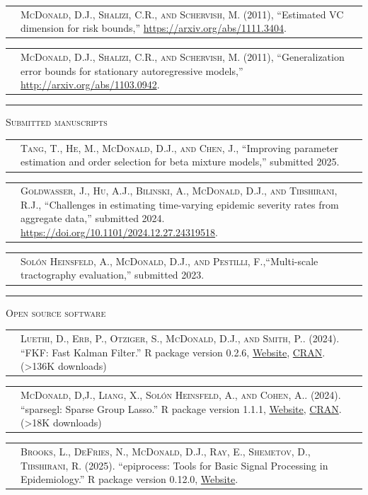 \documentclass[11pt,letterpaper]{minimal/moderncv}
\makeatletter
\renewcommand{\section}[1]{  \par\addvspace{15pt}%
  \parbox[t]{\hintscolumnwidth}{\strut\raggedleft\raisebox{4pt}%
  {\rule{\hintscolumnwidth}{2pt}}}%
  \hspace{\separatorcolumnwidth}%
  \textsc{\Large #1}\par\nobreak\addvspace{6pt}%
}
\renewcommand*{\cvitem}[2]{%
  \begin{tabular}{@{}p{\hintscolumnwidth}@{\hspace{\separatorcolumnwidth}}%
    p{\maincolumnwidth}@{}}%
    \raggedleft {#1} &  {#2}%
  \end{tabular}%
}
\makeatother
\begin{document}
\cvitem{}{{\scshape McDonald, D.J., Shalizi, C.R., and Schervish, M.} (2011),
``Estimated VC dimension for risk bounds,''
\url{https://arxiv.org/abs/1111.3404}.\vspace*{6pt}}

\cvitem{}{{\scshape McDonald, D.J., Shalizi, C.R., and Schervish, M.} (2011),
``Generalization error bounds for stationary autoregressive models,''
\url{http://arxiv.org/abs/1103.0942}.}

\section{Submitted manuscripts}

\cvitem{}{{\scshape Tang, T., He, M., McDonald, D.J., and Chen, J.}, ``Improving
parameter estimation and order selection for beta mixture models,'' submitted 2025.\vspace*{6pt}
}


\cvitem{}{{\scshape Goldwasser, J., Hu, A.J., Bilinski, A., McDonald, D.J., and
Tibshirani, R.J.}, ``Challenges in estimating time-varying epidemic severity
rates from aggregate data,'' submitted 2024. 
\url{https://doi.org/10.1101/2024.12.27.24319518}.\vspace*{6pt}
}



\cvitem{}{{\scshape Sol\'on Heinsfeld, A., McDonald, D.J., and Pestilli, F.},``Multi-scale tractography evaluation,'' submitted 2023. 
}


\section{Open source software}

\cvitem{}{\textsc{Luethi, D., Erb, P., Otziger, S., McDonald, D.J., and Smith,
P.}. (2024). ``FKF: Fast Kalman Filter.'' \textsf{R} package version 0.2.6,
\href{https://waternumbers.github.io/FKF/}{Website},
\href{https://cran.r-project.org/package=FKF}{CRAN}. (>136K
downloads)\vspace*{6pt}}

\cvitem{}{\textsc{McDonald, D,J., Liang, X., Solón Heinsfeld, A., and Cohen,
A.}. (2024). ``sparsegl: Sparse Group Lasso.'' \textsf{R} package version 1.1.1,
\href{https://dajmcdon.github.io/sparsegl}{Website},
\href{https://cran.r-project.org/package=sparsegl}{CRAN}. (>18K
downloads)\vspace*{6pt}}

\cvitem{}{\textsc{%
Brooks, L., DeFries, N., McDonald, D.J., Ray, E., Shemetov, D., Tibshirani, R}.
(2025). 
``epiprocess: Tools for Basic Signal Processing in Epidemiology.''
\textsf{R} package version 0.12.0,
\href{https://cmu-delphi.github.io/epiprocess/}{Website}.
\vspace*{6pt}}
\end{document}
